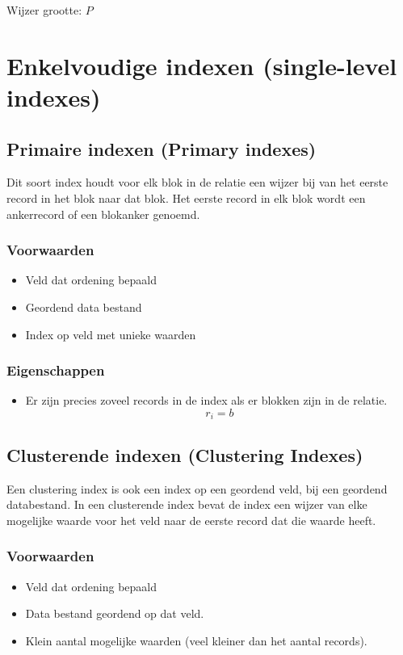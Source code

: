 \documentclass[indexstructuren.tex]{subfiles}
\begin{document}
\begin{de}
Wijzer grootte: $P$
\end{de}

\section{Enkelvoudige indexen (single-level indexes)}
\subsection{Primaire indexen (Primary indexes)}
Dit soort index houdt voor elk blok in de relatie een wijzer bij van het eerste record in het blok naar dat blok. Het eerste record in elk blok wordt een ankerrecord of een blokanker genoemd.

\subsubsection*{Voorwaarden}
\begin{itemize}
\item Veld dat ordening bepaald
\item Geordend data bestand
\item Index op veld met unieke waarden
\end{itemize}
\subsubsection*{Eigenschappen}
\begin{itemize}
\item
Er zijn precies zoveel records in de index als er blokken zijn in de relatie.
\[
r_i = b
\]
\end{itemize}

\subsection{Clusterende indexen (Clustering Indexes)}
Een clustering index is ook een index op een geordend veld, bij een geordend databestand. In een clusterende index bevat de index een wijzer van elke mogelijke waarde voor het veld naar de eerste  record dat die waarde heeft.

\subsubsection*{Voorwaarden}
\begin{itemize}
\item Veld dat ordening bepaald
\item Data bestand geordend op dat veld.
\item Klein aantal mogelijke waarden (veel kleiner dan het aantal records).
\end{itemize}
\end{document}

